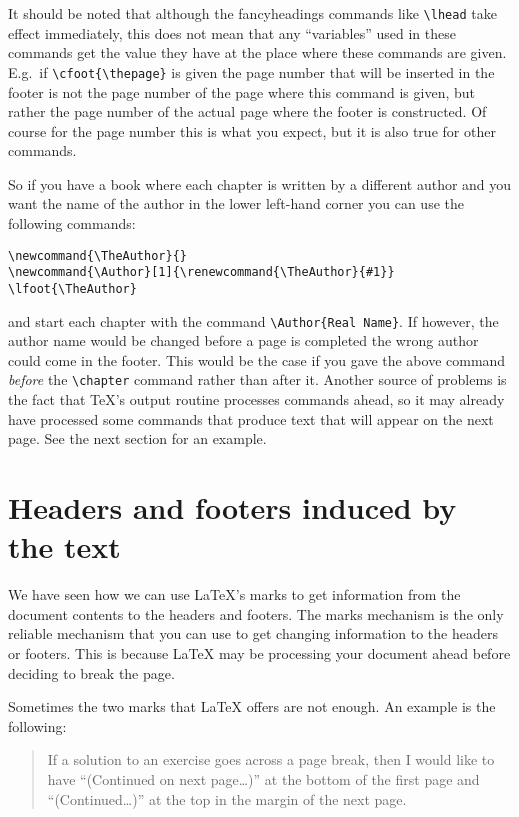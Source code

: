 \documentclass{article}
\def\latex/{\protect\LaTeX{}}
\def\tex/{\TeX}
\begin{document}
It should be noted that although the \textsf{fancyheadings} commands like
\verb|\lhead| take effect immediately, this does not mean that any
``variables'' used in these commands get the value they have at the place
where these commands are given. E.g.\ if \verb|\cfoot{\thepage}| is given
the page number that will be inserted in the footer is not the page number
of the page where this command is given, but rather the page number of
the actual page where the footer is constructed. Of course for the page
number this is what you expect, but it is also true for other commands.

So if you have a book where each chapter is written by a different author
and you want the name of the author in the lower left-hand corner you can
use the following commands:

\begin{verbatim}
\newcommand{\TheAuthor}{}
\newcommand{\Author}[1]{\renewcommand{\TheAuthor}{#1}}
\lfoot{\TheAuthor}
\end{verbatim}

\noindent and start each chapter with the command 
\verb|\Author{Real Name}|.
 If however, the author name would be changed before a page is
completed the wrong author could come in the footer. This would be the case
if you gave the above command \emph{before} the \verb|\chapter| command
rather than after it. 
Another source of problems is the fact that \tex/'s output routine processes
commands ahead, so it may already have processed some commands that produce
text that will appear on the next page. See the next section for an example.

\section{Headers and footers induced by the text}
\label{sec:xmarks}

We have seen how we can use \LaTeX's marks to get information from the
document contents to the headers and footers. The marks mechanism is the
only reliable mechanism that you can use to get changing information to the
headers or footers. This is because \latex/ may be processing your document
ahead before deciding to break the page. 

Sometimes the two marks that \latex/ offers are not enough. An example is
the following:
\begin{quote}
 If a solution to an exercise goes across a page break, then I would like
 to have ``(Continued on next page\ldots)'' at the bottom of the
 first page and ``(Continued\ldots)'' at the top in the margin of the next page.
\end{quote}
\end{document}
